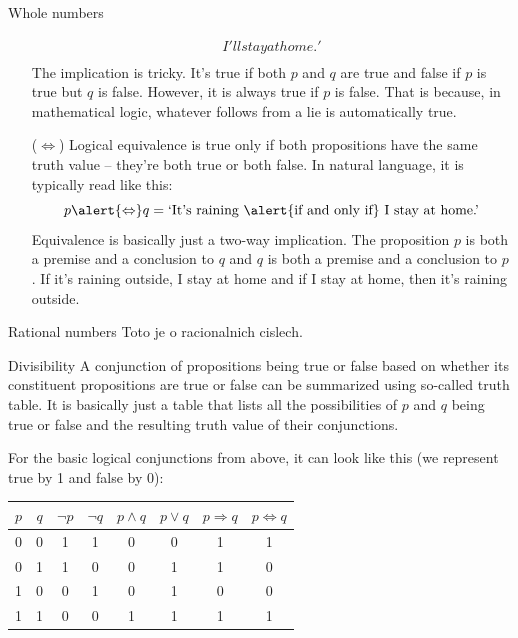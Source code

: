 \documentclass[final]{beamer}
\newlength{\colwidth}
\begin{document}
\begin{frame}[t]
\begin{columns}[t]
\begin{column}{\colwidth}
\begin{exampleblock}{Whole numbers}
\begin{itemize}[left=40pt]
\begin{align*}
{     I'll stay at home.'}\\
    \end{align*}
    The implication is tricky. It's true if both $p$ and $q$ are true and false
    if $p$ is true but $q$ is false. However, it is \alert{always true} if $p$
    is \alert{false}. That is because, in mathematical logic, whatever follows
    from a lie is automatically true.
   \item[($ \Leftrightarrow $)] Logical \alert{equivalence} is true only if both
    propositions have the \alert{same truth value} -- they're both true or both
    false. In natural language, it is typically read like this:
    \[
     p \alert{ \Leftrightarrow }q = \text{`It's raining \alert{if and only if}
     I stay at home.'}
    \]
    Equivalence is basically just a two-way implication. The proposition $p$ is
    both a premise and a conclusion to $q$ and $q$ is both a premise and a
    conclusion to $p$. If it's raining outside, I stay at home and if I stay at
    home, then it's raining outside.
  \end{itemize}
 \end{exampleblock}

 \begin{alertblock}{Rational numbers}
  Toto je o racionalnich cislech.
 \end{alertblock}

 \begin{block}{Divisibility}
  A conjunction of propositions being true or false based on whether its
  constituent propositions are true or false can be summarized using so-called
  \alert{truth table}. It is basically just a table that lists all the
  possibilities of $p$ and $q$ being true or false and the resulting truth value
  of their conjunctions.

  For the basic logical conjunctions from above, it can look like this (we
  represent \alert{true} by \alert{1} and \alert{false} by \alert{0}):
  \begin{center}
   \begin{tabular}{c | c | c | c | c | c | c | c}
    $p$ & $q$ & $\neg p$ & $\neg q$ & $p \wedge q$ & $p \vee q$ & $p \Rightarrow
    q$ & $p \Leftrightarrow q$\\
    \toprule
    0 & 0 & 1 & 1 & 0 & 0 & 1 & 1\\
    \midrule
    0 & 1 & 1 & 0 & 0 & 1 & 1 & 0\\
    \midrule
    1 & 0 & 0 & 1 & 0 & 1 & 0 & 0\\
    \midrule
    1 & 1 & 0 & 0 & 1 & 1 & 1 & 1
   \end{tabular}
  \end{center}
 \end{block}
\end{column}


\end{columns}
\end{frame}
\end{document}
